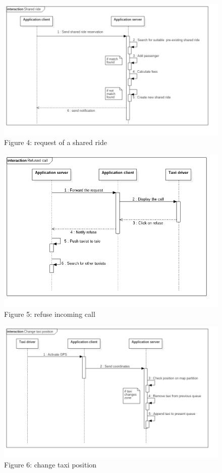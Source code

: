 \begin{figure} [h]
\centering\includegraphics[scale=0.5]{Sequence Diagrams/Shared_ride.png}
\caption{Figure 4: request of a shared ride }
\end{figure}

\begin{figure} [h]
\centering\includegraphics[scale=0.5]{Sequence Diagrams/refuse_call.png}
\caption{Figure 5: refuse incoming call }
\end{figure}

\begin{figure} [h]
\centering\includegraphics[scale=0.5]{Sequence Diagrams/change_taxi_position.png}
\caption{Figure 6: change taxi position }
\end{figure}

